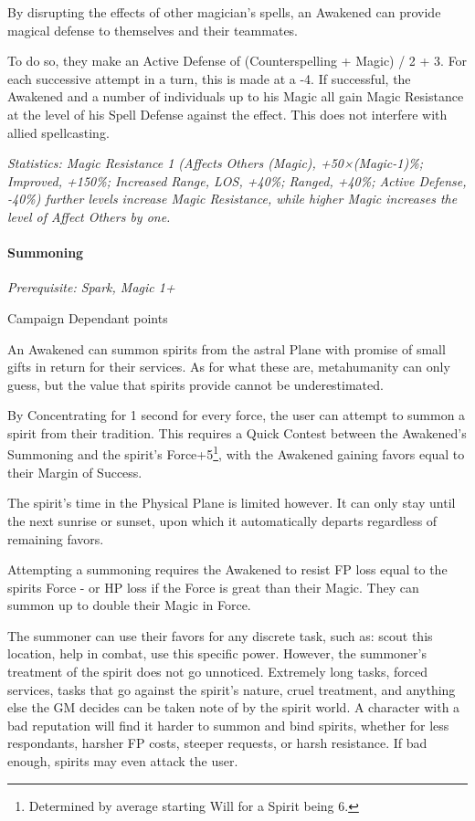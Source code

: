 \begin{multicols*}{3}
	By disrupting the effects of other magician's spells, an Awakened can provide magical defense to themselves and their teammates.
	
	To do so, they make an Active Defense of (Counterspelling + Magic) / 2 + 3. For each successive attempt in a turn, this is made at a -4. If successful, the Awakened and a number of individuals up to his Magic all gain Magic Resistance at the level of his Spell Defense against the effect. This does not interfere with allied spellcasting.
	
	\textit{\textcolor{OliveGreen}{Statistics: Magic Resistance 1 (Affects Others (Magic), +50×(Magic-1)\%; Improved, +150\%; Increased Range, LOS, +40\%; Ranged, +40\%; Active Defense, -40\%) further levels increase Magic Resistance, while higher Magic increases the level of Affect Others by one.}}
	
	\paragraph{Summoning}\label{summoning}
	\textit{Prerequisite: Spark, Magic 1+}
	\begin{flushright}
		Campaign Dependant points
	\end{flushright}
	
	An Awakened can summon spirits from the astral Plane with promise of small gifts in return for their services. As for what these are, metahumanity can only guess, but the value that spirits provide cannot be underestimated.
	
	By Concentrating for 1 second for every force, the user can attempt to summon a spirit from their tradition. This requires a Quick Contest between the Awakened's Summoning and the spirit's Force+5\footnote{Determined by average starting Will for a Spirit being 6.}, with the Awakened gaining favors equal to their Margin of Success. 
	
	The spirit's time in the Physical Plane is limited however. It can only stay until the next sunrise or sunset, upon which it automatically departs regardless of remaining favors.
	
	Attempting a summoning requires the Awakened to resist FP loss equal to the spirits Force - or HP loss if the Force is great than their Magic. They can summon up to double their Magic in Force.
	
	The summoner can use their favors for any discrete task, such as: scout this location, help in combat, use this specific power. However, the summoner's treatment of the spirit does not go unnoticed. Extremely long tasks, forced services, tasks that go against the spirit's nature, cruel treatment, and anything else the GM decides can be taken note of by the spirit world. A character with a bad reputation will find it harder to summon and bind spirits, whether for less respondants, harsher FP costs, steeper requests, or harsh resistance. If bad enough, spirits may even attack the user.
	

\end{multicols*}
